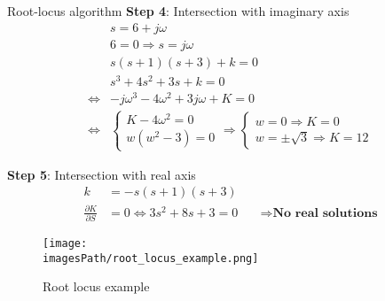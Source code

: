 \documentclass{article}
\newcommand{\imagesPath}{images}
\begin{document}
\begin{exampleblock}{Root-locus algorithm}
    \textbf{Step 4}: Intersection with imaginary axis
    \begin{align*}
        &s = 6 + j\omega \\
        &6 = 0 \Rightarrow s = j\omega \\
        &s(s+1)(s+3) + k = 0 \\
        &s^3 + 4s^2 + 3s + k = 0  \\
        \Leftrightarrow &-j\omega^3 - 4\omega^2 + 3j\omega + K = 0 \\
        \Leftrightarrow 
        &\begin{cases}
            K - 4\omega^2 = 0 \\
            w(w^2-3) = 0  
        \end{cases}
        \Rightarrow
        \begin{cases}
            w = 0 \Rightarrow K = 0 \\
            w = \pm\sqrt{3} \Rightarrow K = 12
        \end{cases}
    \end{align*}

    \textbf{Step 5}: Intersection with real axis 
    \begin{align*}
        k &= -s(s+1)(s+3) \\
        \frac{\partial K}{\partial S} &= 0 \Leftrightarrow 3s^2 + 8s + 3 = 0
        &\quad \Rightarrow \textbf{No real solutions}
    \end{align*}
\end{exampleblock}
\begin{figure}[!h]
    \centering
    \texttt{[image: \\imagesPath/root\_locus\_example.png]}
    \caption{Root locus example}
    \label{fig:root_locus_example}
\end{figure}
\end{document}
